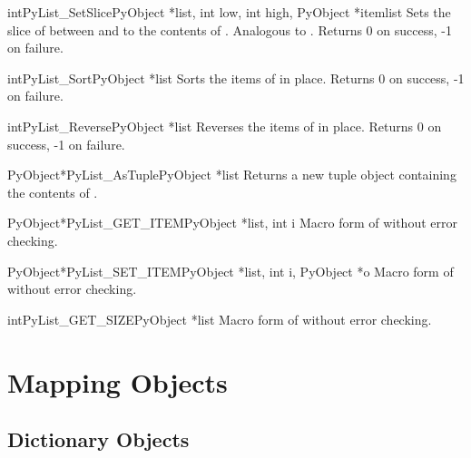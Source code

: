 \documentclass{manual}
\begin{document}
\begin{cfuncdesc}{int}{PyList_SetSlice}{PyObject *list,
                                        int low, int high,
                                        PyObject *itemlist}
Sets the slice of  between  and  to the contents
of .  Analogous to .  Returns 0
on success, -1 on failure.
\end{cfuncdesc}

\begin{cfuncdesc}{int}{PyList_Sort}{PyObject *list}
Sorts the items of  in place.  Returns 0 on success, -1 on failure.
\end{cfuncdesc}

\begin{cfuncdesc}{int}{PyList_Reverse}{PyObject *list}
Reverses the items of  in place.  Returns 0 on success, -1 on failure.
\end{cfuncdesc}

\begin{cfuncdesc}{PyObject*}{PyList_AsTuple}{PyObject *list}
Returns a new tuple object containing the contents of .
\end{cfuncdesc}

\begin{cfuncdesc}{PyObject*}{PyList_GET_ITEM}{PyObject *list, int i}
Macro form of  without error checking.
\end{cfuncdesc}

\begin{cfuncdesc}{PyObject*}{PyList_SET_ITEM}{PyObject *list, int i,
                                              PyObject *o}
Macro form of  without error checking.
\end{cfuncdesc}

\begin{cfuncdesc}{int}{PyList_GET_SIZE}{PyObject *list}
Macro form of  without error checking.
\end{cfuncdesc}


\section{Mapping Objects \label{mapObjects}}

\subsection{Dictionary Objects \label{dictObjects}}
\end{document}
